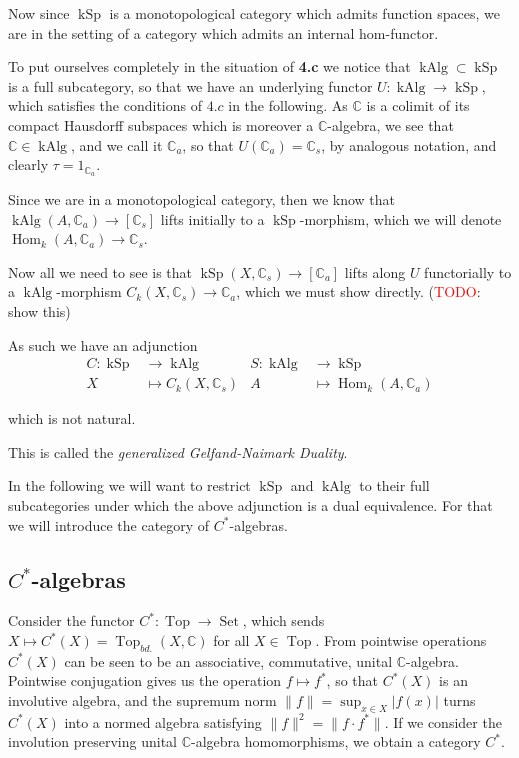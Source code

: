 \documentclass[12pt,a4paper]{article}
\DeclareMathOperator{\Hom}{Hom}
\DeclareMathOperator{\Set}{Set}
\DeclareMathOperator{\Top}{Top}
\DeclareMathOperator{\kSp}{kSp}
\DeclareMathOperator{\kAlg}{kAlg}
\begin{document}
Now since $\kSp$ is a monotopological category which admits function spaces, we are in the setting of a category which admits an internal hom-functor. 

To put ourselves completely in the situation of \textbf{4.c} we notice that $\kAlg \subset \kSp$ is a full subcategory, so that we have an underlying functor $U: \kAlg \to \kSp$, which satisfies the conditions of $4.c$ in the following. As $\mathbb{C}$ is a colimit of its compact Hausdorff subspaces which is moreover a $\mathbb{C}$-algebra, we see that $\mathbb{C} \in \kAlg$, and we call it $\mathbb{C}_a$,  so that $U(\mathbb{C}_a) = \mathbb{C}_s$, by analogous notation, and clearly $\tau = 1_{\mathbb{C}_a}. $

Since  we are in a monotopological category, then we know that $\kAlg(A, \mathbb{C}_a) \to [\mathbb{C}_s]$
lifts initially to a $\kSp$-morphism, which we will denote $\Hom_k(A, \mathbb{C}_a) \to \mathbb{C}_s$.

Now all we need to see is that $\kSp(X,\mathbb{C}_s) \to [\mathbb{C}_a]$ lifts along $U$ functorially to a $\kAlg$-morphism $C_k(X, \mathbb{C}_s) \to \mathbb{C}_a$, which we must show directly. (\textcolor{red}{TODO}: show this)

As such we have an adjunction 
\begin{align*}
	C: \kSp & \to \kAlg &  S: \kAlg & \to \kSp\\
	X &\mapsto C_k(X, \mathbb{C}_s) & A &\mapsto \Hom_k(A, \mathbb{C}_a)
\end{align*}

which is not natural.

This is called the \emph{generalized Gelfand-Naimark Duality}. 

In the following we will want to restrict $\kSp$ and $\kAlg$ to their full subcategories under which the above adjunction is a dual equivalence. For that we will introduce the category of $C^*$-algebras.
\subsection{$C^*$-algebras}
Consider the functor $C^*: \Top \to \Set$, which sends  $X \mapsto C^*(X) = \Top_{bd.}(X, \mathbb{C})$ for all $X \in \Top$. 
From pointwise operations $C^*(X)$ can be seen to be an associative, commutative, unital $\mathbb{C}$-algebra. Pointwise conjugation gives us the operation $f \mapsto f^*$, so that $C^*(X)$ is an involutive algebra, and the supremum norm $\lVert f \lVert = \sup_{x \in X}\lvert f(x)\lvert $ turns $C^*(X)$ into a normed algebra satisfying $\lVert f \lVert^2 = \lVert f \cdot f^* \lVert$. If we consider the involution preserving unital $\mathbb{C}$-algebra homomorphisms, we obtain a category $C^*$.
\end{document}
